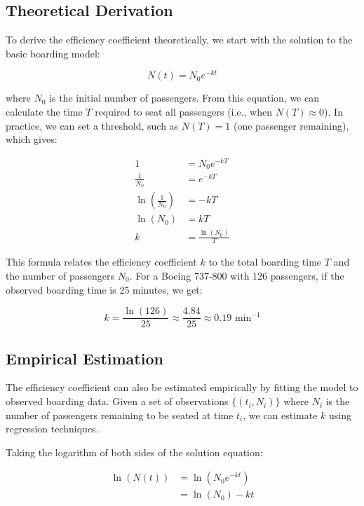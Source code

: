 \documentclass[12pt,a4paper]{article}
\begin{document}
\subsection{Theoretical Derivation}

To derive the efficiency coefficient theoretically, we start with the solution to the basic boarding model:

\begin{equation}
N(t) = N_0 e^{-kt}
\end{equation}

where $N_0$ is the initial number of passengers. From this equation, we can calculate the time $T$ required to seat all passengers (i.e., when $N(T) \approx 0$). In practice, we can set a threshold, such as $N(T) = 1$ (one passenger remaining), which gives:

\begin{align}
1 &= N_0 e^{-kT} \\
\frac{1}{N_0} &= e^{-kT} \\
\ln\left(\frac{1}{N_0}\right) &= -kT \\
\ln(N_0) &= kT \\
k &= \frac{\ln(N_0)}{T}
\end{align}

This formula relates the efficiency coefficient $k$ to the total boarding time $T$ and the number of passengers $N_0$. For a Boeing 737-800 with 126 passengers, if the observed boarding time is 25 minutes, we get:

\begin{equation}
k = \frac{\ln(126)}{25} \approx \frac{4.84}{25} \approx 0.19 \text{ min}^{-1}
\end{equation}

\subsection{Empirical Estimation}

The efficiency coefficient can also be estimated empirically by fitting the model to observed boarding data. Given a set of observations $\{(t_i, N_i)\}$ where $N_i$ is the number of passengers remaining to be seated at time $t_i$, we can estimate $k$ using regression techniques.

Taking the logarithm of both sides of the solution equation:

\begin{align}
\ln(N(t)) &= \ln(N_0 e^{-kt}) \\
&= \ln(N_0) - kt
\end{align}
\end{document}
